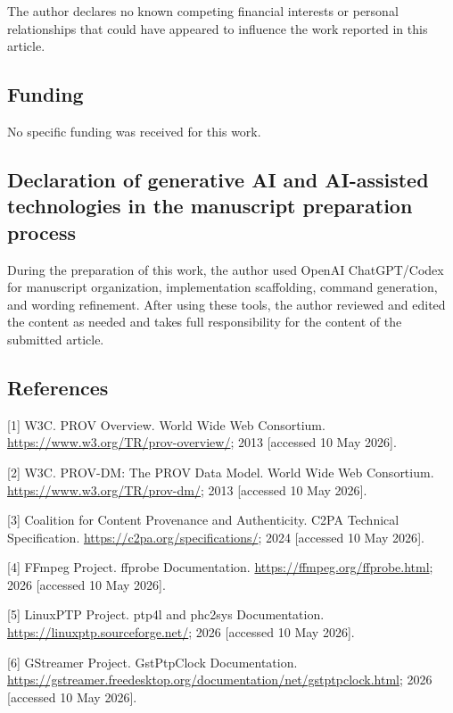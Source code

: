 \documentclass[
]{article}
\begin{document}
The author declares no known competing financial interests or personal
relationships that could have appeared to influence the work reported in
this article.

\subsection{Funding}\label{funding}

No specific funding was received for this work.

\subsection{Declaration of generative AI and AI-assisted technologies in
the manuscript preparation
process}\label{declaration-of-generative-ai-and-ai-assisted-technologies-in-the-manuscript-preparation-process}

During the preparation of this work, the author used OpenAI
ChatGPT/Codex for manuscript organization, implementation scaffolding,
command generation, and wording refinement. After using these tools, the
author reviewed and edited the content as needed and takes full
responsibility for the content of the submitted article.

\subsection{References}\label{references}

{[}1{]} W3C. PROV Overview. World Wide Web Consortium.
\url{https://www.w3.org/TR/prov-overview/}; 2013 {[}accessed 10 May
2026{]}.

{[}2{]} W3C. PROV-DM: The PROV Data Model. World Wide Web Consortium.
\url{https://www.w3.org/TR/prov-dm/}; 2013 {[}accessed 10 May 2026{]}.

{[}3{]} Coalition for Content Provenance and Authenticity. C2PA
Technical Specification. \url{https://c2pa.org/specifications/}; 2024
{[}accessed 10 May 2026{]}.

{[}4{]} FFmpeg Project. ffprobe Documentation.
\url{https://ffmpeg.org/ffprobe.html}; 2026 {[}accessed 10 May 2026{]}.

{[}5{]} LinuxPTP Project. ptp4l and phc2sys Documentation.
\url{https://linuxptp.sourceforge.net/}; 2026 {[}accessed 10 May
2026{]}.

{[}6{]} GStreamer Project. GstPtpClock Documentation.
\url{https://gstreamer.freedesktop.org/documentation/net/gstptpclock.html};
2026 {[}accessed 10 May 2026{]}.
\end{document}
